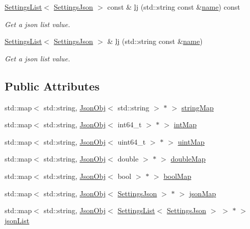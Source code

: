 \begin{DoxyCompactItemize}
\hyperlink{class_settings_list}{Settings\+List}$<$ \hyperlink{class_settings_json}{Settings\+Json} $>$ const  \& \hyperlink{class_settings_json_abf1706f5c417b2733c3d0c815d141524}{lj} (std\+::string const \&\hyperlink{class_settings_json_a301eda8c47d1140298fade3907c723d6}{name}) const
\begin{DoxyCompactList}\small\item\em Get a json list value. \end{DoxyCompactList}\item 
\hyperlink{class_settings_list}{Settings\+List}$<$ \hyperlink{class_settings_json}{Settings\+Json} $>$ \& \hyperlink{class_settings_json_ac2ae204a71639b25c82563eb49d8edcd}{lj} (std\+::string const \&\hyperlink{class_settings_json_a301eda8c47d1140298fade3907c723d6}{name})
\begin{DoxyCompactList}\small\item\em Get a json list value. \end{DoxyCompactList}\end{DoxyCompactItemize}
\subsection*{Public Attributes}
\begin{DoxyCompactItemize}
\item 
std\+::map$<$ std\+::string, \hyperlink{class_json_obj}{Json\+Obj}$<$ std\+::string $>$ $\ast$ $>$ \hyperlink{class_settings_json_a84ac99a71e39c546ac5b685acf7d57ec}{string\+Map}
\item 
std\+::map$<$ std\+::string, \hyperlink{class_json_obj}{Json\+Obj}$<$ int64\+\_\+t $>$ $\ast$ $>$ \hyperlink{class_settings_json_a0e4166c9ce03889e5afdec95d14558a4}{int\+Map}
\item 
std\+::map$<$ std\+::string, \hyperlink{class_json_obj}{Json\+Obj}$<$ uint64\+\_\+t $>$ $\ast$ $>$ \hyperlink{class_settings_json_a6ccee345ddcbf7f3bf8e8d5095153b35}{uint\+Map}
\item 
std\+::map$<$ std\+::string, \hyperlink{class_json_obj}{Json\+Obj}$<$ double $>$ $\ast$ $>$ \hyperlink{class_settings_json_adcdcce079145c37461af329511cd1c25}{double\+Map}
\item 
std\+::map$<$ std\+::string, \hyperlink{class_json_obj}{Json\+Obj}$<$ bool $>$ $\ast$ $>$ \hyperlink{class_settings_json_a34a59bde0b2758c8d9160681cc0e666e}{bool\+Map}
\item 
std\+::map$<$ std\+::string, \hyperlink{class_json_obj}{Json\+Obj}$<$ \hyperlink{class_settings_json}{Settings\+Json} $>$ $\ast$ $>$ \hyperlink{class_settings_json_a53d8eda20a8dc989065225b7064f4211}{json\+Map}
\item 
std\+::map$<$ std\+::string, \hyperlink{class_json_obj}{Json\+Obj}$<$ \hyperlink{class_settings_list}{Settings\+List}$<$ \hyperlink{class_settings_json}{Settings\+Json} $>$ $>$ $\ast$ $>$ \hyperlink{class_settings_json_a689e48666555a947bbeca14554f2baa9}{json\+List}
\end{DoxyCompactItemize}


